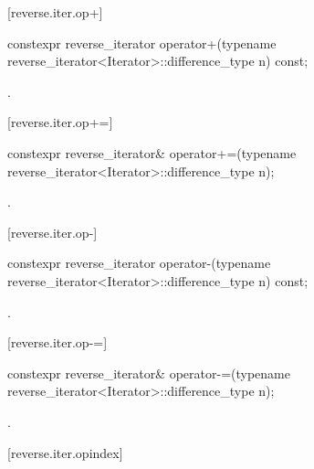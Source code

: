 [reverse.iter.op+]{}

%
\begin{itemdecl}
constexpr reverse_iterator
operator+(typename reverse_iterator<Iterator>::difference_type n) const;
\end{itemdecl}

\begin{itemdescr}
\pnum
\returns
{}.
\end{itemdescr}

[reverse.iter.op+=]{}

%
\begin{itemdecl}
constexpr reverse_iterator&
operator+=(typename reverse_iterator<Iterator>::difference_type n);
\end{itemdecl}

\begin{itemdescr}
\pnum
\effects
{}

\pnum
\returns
{}.
\end{itemdescr}

[reverse.iter.op-]{}

%
\begin{itemdecl}
constexpr reverse_iterator
operator-(typename reverse_iterator<Iterator>::difference_type n) const;
\end{itemdecl}

\begin{itemdescr}
\pnum
\returns
{}.
\end{itemdescr}

[reverse.iter.op-=]{}

%
\begin{itemdecl}
constexpr reverse_iterator&
operator-=(typename reverse_iterator<Iterator>::difference_type n);
\end{itemdecl}

\begin{itemdescr}
\pnum
\effects
{}

\pnum
\returns
{}.
\end{itemdescr}

[reverse.iter.opindex]{}

